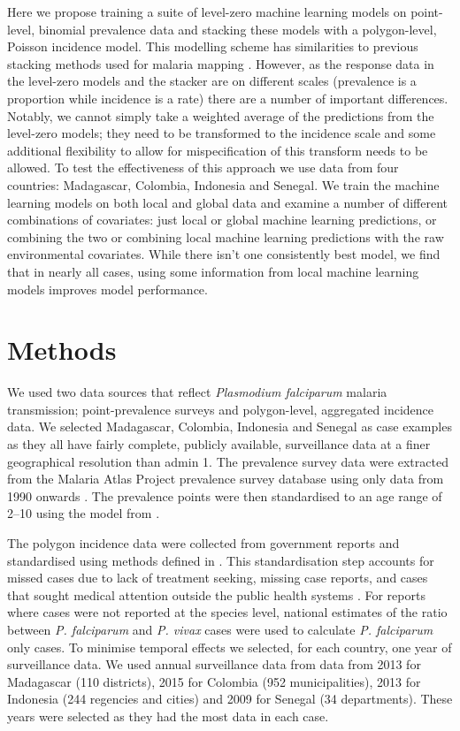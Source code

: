\documentclass[11pt]{article}
\begin{document}
Here we propose training a suite of level-zero machine learning models on point-level, binomial prevalence data and stacking these models with a polygon-level, Poisson incidence model.
This modelling scheme has similarities to previous stacking methods used for malaria mapping \citep{bhatt2017improved}.
However, as the response data in the level-zero models and the stacker are on different scales (prevalence is a proportion while incidence is a rate) there are a number of important differences.
Notably, we cannot simply take a weighted average of the predictions from the level-zero models; they need to be transformed to the incidence scale and some additional flexibility to allow for mispecification of this transform needs to be allowed.
To test the effectiveness of this approach we use data from four countries: Madagascar, Colombia, Indonesia and Senegal.
We train the machine learning models on both local and global data and examine a number of different combinations of covariates: just local or global machine learning predictions, or combining the two or combining local machine learning predictions with the raw environmental covariates.
While there isn't one consistently best model, we find that in nearly all cases, using some information from local machine learning models improves model performance.


\section{Methods}

We used two data sources that reflect \emph{Plasmodium falciparum} malaria transmission; point-prevalence surveys and polygon-level, aggregated incidence data. 
We selected Madagascar, Colombia, Indonesia and Senegal as case examples as they all have fairly complete, publicly available, surveillance data at a finer geographical resolution than admin 1.
The prevalence survey data were extracted from the Malaria Atlas Project prevalence survey database using only data from 1990 onwards \citep{bhatt2015effect, guerra2007assembling, pfeffer2018ma}.
The prevalence points were then standardised to an age range of 2--10 using the model from \citep{smith2007standardizing}.

The polygon incidence data were collected from government reports and standardised using methods defined in \cite{cibulskis2011worldwide}.
This standardisation step accounts for missed cases due to lack of treatment seeking, missing case reports, and cases that sought medical attention outside the public health systems \citep{battle2016treatment}.
For reports where cases were not reported at the species level, national estimates of the ratio between \emph{P. falciparum} and \emph{P. vivax} cases were used to calculate \emph{P. falciparum} only cases. 
To minimise temporal effects we selected, for each country, one year of surveillance data. 
We used annual surveillance data from data from 2013 for Madagascar (110 districts), 2015 for Colombia (952 municipalities), 2013 for Indonesia (244 regencies and cities) and 2009 for Senegal (34 departments).
These years were selected as they had the most data in each case.
\end{document}
